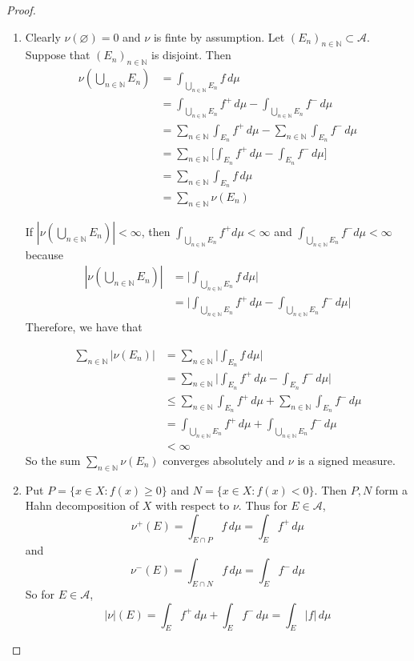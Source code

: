 \documentclass[12pt]{amsart}
\theoremstyle{definition}
\newcommand{\N}{\mathbb{N}}
\newcommand{\MA}{\mathcal{A}}
\newcommand{\dmu}{\, d \mu}
\begin{document}
	\begin{proof}
		
		\begin{enumerate}
			
			\item Clearly $\nu(\varnothing) = 0$ and $\nu$ is finte by assumption. Let $(E_n)_{n \in \N} \subset \MA$. Suppose that $(E_n)_{n \in \N}$ is disjoint. Then 
			\begin{align*}
				\nu(\bigcup_{n \in \N} E_n)
				&= \int_{\bigcup_{n \in \N} E_n} f \dmu \\ 
				&= \int_{\bigcup_{n \in \N} E_n} f^+ \dmu - \int_{\bigcup_{n \in \N} E_n} f^- \dmu\\
				&= \sum_{n \in \N} \int_{ E_n} f^+ \dmu - \sum_{n \in \N} \int_{E_n} f^- \dmu\\
				&= \sum_{n \in \N} \bigg[ \int_{ E_n} f^+ \dmu - \int_{ E_n} f^- \dmu \bigg]\\
				&= \sum_{n \in \N} \int_{ E_n} f \dmu\\
				&= \sum_{n \in \N} \nu(E_n)
			\end{align*}
			
			If $|\nu(\bigcup_{n \in \N}E_n)| < \infty$, then $ \int_{\bigcup_{n \in \N} E_n} f^+ d  \mu < \infty$ and $ \int_{\bigcup_{n \in \N} E_n} f^- d  \mu < \infty$ because
			\begin{align*}
				|\nu(\bigcup_{n \in \N}E_n)|
				&=\bigg |\int_{\bigcup_{n \in \N} E_n} f \dmu\bigg| \\
				&= \bigg |\int_{\bigcup_{n \in \N} E_n} f^+ \dmu - \int_{\bigcup_{n \in \N} E_n} f^- \dmu \bigg|
			\end{align*} Therefore, we have that
			
			\begin{align*}
				\sum_{n \in \N} |\nu(E_n)|
				&=  \sum_{n \in \N} \bigg|\int_{E_n} f \dmu \bigg|\\
				&= \sum_{n \in \N} \bigg| \int_{E_n} f^+ \dmu -  \int_{E_n} f^- \dmu \bigg|\\
				& \leq \sum_{n \in \N}  \int_{E_n} f^+ \dmu  + \sum_{n \in \N}  \int_{E_n} f^- \dmu \\
				&= \int_{\bigcup_{n \in \N} E_n} f^+ \dmu + \int_{\bigcup_{n \in \N} E_n} f^- \dmu\\
				& < \infty
			\end{align*}
			So the sum $\sum_{n \in \N} \nu(E_n)$ converges absolutely and $\nu$ is a signed measure. 
			
			\item Put $P = \{x \in X: f(x) \geq 0\}$ and $N = \{x \in X: f(x) < 0\}$. Then $P,N$ form a Hahn decomposition of $X$ with respect to $\nu$. Thus for $E \in \MA$, 
			$$\nu^+(E) = \int_{E \cap P} f \dmu = \int_E f^+ \dmu$$ and $$\nu^-(E) = \int_{E \cap N} f \dmu = \int_E f^- \dmu$$
			 So for $E \in \MA$, $$|\nu|(E) = \int_E f^+ \dmu + \int_E f^- \dmu = \int_E |f| \dmu$$
		\end{enumerate}
	\end{proof}
	
\end{document}
